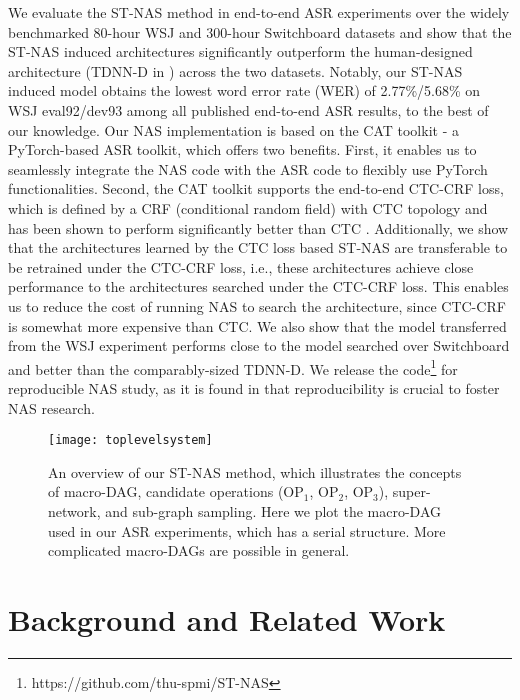 \documentclass{article}
\begin{document}
We evaluate the ST-NAS method in end-to-end ASR experiments over the widely benchmarked 80-hour WSJ and 300-hour Switchboard datasets and show that the ST-NAS induced architectures significantly outperform the human-designed architecture (TDNN-D in \cite{peddinti2018low}) across the two datasets.
Notably, our ST-NAS induced model obtains the lowest word error rate (WER) of 2.77\%/5.68\% on WSJ eval92/dev93 among all published end-to-end ASR results, to the best of our knowledge.
Our NAS implementation is based on the CAT toolkit \cite{an2020cat} - a PyTorch-based ASR toolkit, which offers two benefits. First, it enables us to seamlessly integrate the NAS code with the ASR code to flexibly use PyTorch functionalities. Second, the CAT toolkit supports the end-to-end CTC-CRF loss, which is defined by a CRF (conditional random field) with CTC topology and has been shown to perform significantly better than CTC \cite{xiang2019crf, an2020cat}.
Additionally, we show that the architectures learned by the CTC loss based ST-NAS are transferable to be retrained under the CTC-CRF loss, i.e., these architectures achieve close performance to the architectures searched under the CTC-CRF loss. This enables us to reduce the cost of running NAS to search the architecture, since CTC-CRF is somewhat more expensive than CTC.
We also show that the model transferred from the WSJ experiment performs close to the model searched over Switchboard and better than the comparably-sized TDNN-D.
We release the code\footnote{https://github.com/thu-spmi/ST-NAS} for reproducible NAS study, as it is found in \cite{Li2019Random} that reproducibility is crucial to foster NAS research.

\begin{figure}[t]
    \centering
    \texttt{[image: toplevelsystem]}
    \vspace{-3mm}
    \caption{An overview of our ST-NAS method, which illustrates the concepts of macro-DAG, candidate operations (OP$_1$, OP$_2$, OP$_3$), super-network, and sub-graph sampling.
        Here we plot the macro-DAG used in our ASR experiments, which has a serial structure. More complicated macro-DAGs are possible in general.
    }
    \label{fig:toplevelsystem}
\end{figure}

\section{Background and Related Work}
\label{sec:relatedwork}
\end{document}
